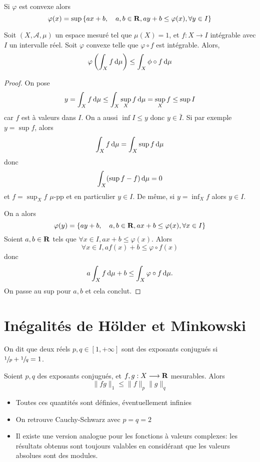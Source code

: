 \begin{prop}
Si $\varphi$ est convexe alors  \[
    \varphi(x)= \sup \left\{ ax+b, \quad  a,b \in  \mathbf R, ay+b\leq \varphi(x), \forall  y \in  I \right\} 
\] 
\end{prop}

\begin{prop}
    Soit $(X, \mathcal  A, \mu)$ un espace mesuré tel que $\mu(X)=1$, et $f:X\longrightarrow I$ intégrable avec $I$ un intervalle réel. Soit $\varphi$ convexe telle que  $\varphi\circ f$ est intégrable. Alors,  \[
        \varphi \left( \int_X f\mathop{}\!\mathrm d \mu \right) \leq  \int_X \phi\circ f\mathop{}\!\mathrm d \mu
    \] 
\end{prop}

\begin{proof}
On pose \[
y=\int_X f\mathop{}\!\mathrm d \mu \leq \int_X \sup_Xf\mathop{}\!\mathrm d\mu=\sup_X f\leq \sup I
\] 
car $f$ est à valeurs dans  $I$. On a aussi $\inf I\leq y$ donc $y \in  \bar{I} $. Si par exemple $y=\sup f$, alors  \[
\int_X f\mathop{}\!\mathrm d\mu =\int_X \sup f\mathop{}\!\mathrm d \mu
\] 
donc \[
    \int_X(\sup f-f)\mathop{}\!\mathrm d \mu=0
\] 
et $f=\sup_X f$  $\mu$-pp et en particulier $y \in I$. De même, si $y=\inf_Xf$ alors $y \in  I$.

On a alors  \[
    \varphi(y)=\left\{ ay+b, \quad  a, b \in  \mathbf R, ax+b \leq \varphi(x), \forall  x \in  I \right\} 
\]
Soient $a, b \in  \mathbf R$ tels que $\forall  x \in  I, ax+b\leq \varphi(x)$. Alors \[
    \forall  x \in  I, af(x)+b\leq \varphi\circ f(x)
\] 
donc \[
    a\int_Xf\mathop{}\!\mathrm d \mu+b\leq \int_X\varphi\circ f\mathop{}\!\mathrm d \mu.
\] 
On passe au sup pour $a, b$ et cela conclut.
\end{proof}

\section{Inégalités de Hölder et Minkowski}

\begin{dfn}
    On dit que deux réels $p, q\in  [1, +\infty]$ sont des exposants conjugués si $\sfrac1p+\sfrac1q=1$.
\end{dfn}

\begin{thm}
     Soient $p, q$ des exposants conjugués, et  $f,g:X\longrightarrow \mathbf R$ mesurables. Alors \[
    \|fg\|_1 \leq \|f\|_p \|g\|_q
    \] 
\end{thm}

\begin{rem}
\begin{itemize}
    \item Toutes ces quantités sont définies, éventuellement infinies
    \item On retrouve Cauchy-Schwarz avec $p=q=2$
    \item Il existe une version analogue pour les fonctions à valeurs complexes: les résultats obtenus sont toujours valables en considérant que les valeurs absolues sont des modules.
\end{itemize}
\end{rem}

